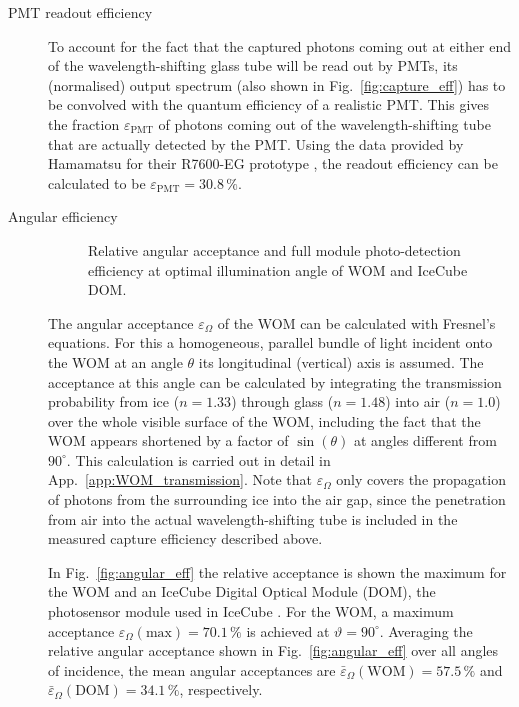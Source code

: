 \begin{description}
\item[PMT readout efficiency]
To account for the fact that the captured photons coming out at either end of 
the wavelength-shifting glass tube will be read out by PMTs, its (normalised) 
output spectrum (also shown in Fig.~\ref{fig:capture_eff}) has to be convolved
with the quantum efficiency of a realistic PMT. This gives the fraction 
$\varepsilon_\mathrm{PMT}$ of photons coming out of the wavelength-shifting tube 
that are actually detected by the PMT. Using the data provided by Hamamatsu for 
their R7600-EG prototype \cite{hamamatsu}, the readout efficiency can be 
calculated to be $\varepsilon_\mathrm{PMT} = 30.8\,\%$.

\item[Angular efficiency]

\begin{figure}[htb]
\centering
  \caption{Relative angular acceptance \protect{} and full
    module photo-detection efficiency at optimal illumination angle
    \protect{} of WOM and IceCube DOM.}
\label{fig:WOM_DOM_effs}
\end{figure}

The angular acceptance $\varepsilon_\Omega$ of the WOM can be calculated with 
Fresnel's equations. For this a homogeneous, parallel bundle of light incident
onto the WOM at an angle $\theta$ \wrt its longitudinal (\ie vertical) axis is
assumed. The acceptance at this angle can be calculated by integrating the
transmission probability from ice ($n=1.33$) through glass ($n=1.48$) into air
($n=1.0$) over the whole visible surface of the WOM, including the fact that the
WOM appears shortened by a factor of $\sin(\theta)$ at angles different from
$90^\circ$. This calculation is carried out in detail in
App.~\ref{app:WOM_transmission}. Note that $\varepsilon_\Omega$ only covers the
propagation of photons from the surrounding ice into the air gap, since the
penetration from air into the actual wavelength-shifting tube is included in the
measured capture efficiency described above.

In Fig.~\ref{fig:angular_eff} the relative acceptance is shown \wrt the maximum 
for the WOM and an IceCube Digital Optical Module (DOM), the photosensor module 
used in IceCube \cite{Dima}. For the WOM, a maximum acceptance
$\varepsilon_\Omega(\mathrm{max}) = 70.1\,\%$ is achieved at 
$\vartheta=90^\circ$. Averaging the relative angular acceptance shown in 
Fig.~\ref{fig:angular_eff} over all angles of incidence, the mean angular 
acceptances are $\bar\varepsilon_\Omega(\mathrm{WOM}) = 57.5\,\%$ and 
$\bar\varepsilon_\Omega(\mathrm{DOM}) = 34.1\,\%$, respectively.

\end{description}

